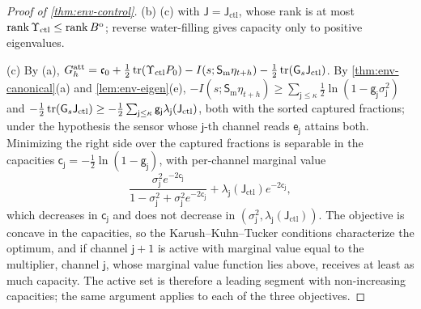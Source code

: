 \begin{proof}[Proof of \cref{thm:env-control}]
(b) (c) with $\mathsf J=\mathsf J_{\mathrm{ctl}}$, whose rank is at most $\operatorname{rank}\Upsilon_{\mathrm{ctl}}\le\operatorname{rank} B^{\mathrm o}$; reverse water-filling gives capacity only to positive eigenvalues.

(c) By (a), $G^{\mathrm{att}}_h=\mathfrak c_0+\frac12\operatorname{tr}(\Upsilon_{\mathrm{ctl}}P_0)-I(s;\mathsf S_{\mathrm m}\eta_{t+h})-\frac12\operatorname{tr}(\mathsf G_s\mathsf J_{\mathrm{ctl}})$. By \cref{thm:env-canonical}(a) and \cref{lem:env-eigen}(e), $-I(s;\mathsf S_{\mathrm m}\eta_{t+h})\ge\sum_{\mathsf j\le\kappa}\frac12\ln(1-\mathsf g_{\mathsf j}\sigma_{\mathsf j}^2)$ and $-\frac12\operatorname{tr}(\mathsf G_s\mathsf J_{\mathrm{ctl}})\ge-\frac12\sum_{\mathsf j\le\kappa}\mathsf g_{\mathsf j}\lambda_{\mathsf j}(\mathsf J_{\mathrm{ctl}})$, both with the sorted captured fractions; under the hypothesis the sensor whose $\mathsf j$-th channel reads $\mathsf e_{\mathsf j}$ attains both. Minimizing the right side over the captured fractions is separable in the capacities $\mathsf c_{\mathsf j}=-\frac12\ln(1-\mathsf g_{\mathsf j})$, with per-channel marginal value
\[
\frac{\sigma_{\mathsf j}^2e^{-2\mathsf c_{\mathsf j}}}{1-\sigma_{\mathsf j}^2+\sigma_{\mathsf j}^2e^{-2\mathsf c_{\mathsf j}}}+\lambda_{\mathsf j}(\mathsf J_{\mathrm{ctl}})e^{-2\mathsf c_{\mathsf j}},
\]
which decreases in $\mathsf c_{\mathsf j}$ and does not decrease in $(\sigma_{\mathsf j}^2,\lambda_{\mathsf j}(\mathsf J_{\mathrm{ctl}}))$. The objective is concave in the capacities, so the Karush--Kuhn--Tucker conditions characterize the optimum, and if channel $\mathsf j+1$ is active with marginal value equal to the multiplier, channel $\mathsf j$, whose marginal value function lies above, receives at least as much capacity. The active set is therefore a leading segment with non-increasing capacities; the same argument applies to each of the three objectives.
\end{proof}


